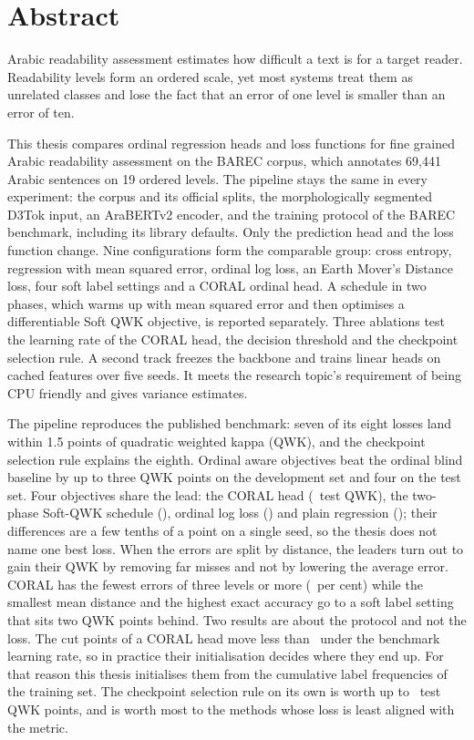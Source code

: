 \documentclass[12pt]{report}
\begin{document}
\clearpage
\chapter*{Abstract}
Arabic readability assessment estimates how difficult a text is for a target reader. Readability levels form an ordered scale, yet most systems treat them as unrelated classes and lose the fact that an error of one level is smaller than an error of ten.

This thesis compares ordinal regression heads and loss functions for fine grained Arabic readability assessment on the BAREC corpus, which annotates 69,441 Arabic sentences on 19 ordered levels. The pipeline stays the same in every experiment: the corpus and its official splits, the morphologically segmented D3Tok input, an AraBERTv2 encoder, and the training protocol of the BAREC benchmark, including its library defaults. Only the prediction head and the loss function change. Nine configurations form the comparable group: cross entropy, regression with mean squared error, ordinal log loss, an Earth Mover's Distance loss, four soft label settings and a CORAL ordinal head. A schedule in two phases, which warms up with mean squared error and then optimises a differentiable Soft QWK objective, is reported separately. Three ablations test the learning rate of the CORAL head, the decision threshold and the checkpoint selection rule. A second track freezes the backbone and trains linear heads on cached features over five seeds. It meets the research topic's requirement of being CPU friendly and gives variance estimates.

The pipeline reproduces the published benchmark: seven of its eight losses land within 1.5 points of quadratic weighted kappa (QWK), and the checkpoint selection rule explains the eighth. Ordinal aware objectives beat the ordinal blind baseline by up to three QWK points on the development set and four on the test set. Four objectives share the lead: the CORAL head (\testQwkCoral\ test QWK), the two-phase Soft-QWK schedule (\testQwkSoftqwk), ordinal log loss (\testQwkOLL) and plain regression (\testQwkMSE); their differences are a few tenths of a point on a single seed, so the thesis does not name one best loss. When the errors are split by distance, the leaders turn out to gain their QWK by removing far misses and not by lowering the average error. CORAL has the fewest errors of three levels or more (\testFarThreeCoral\ per cent) while the smallest mean distance and the highest exact accuracy go to a soft label setting that sits two QWK points behind. Two results are about the protocol and not the loss. The cut points of a CORAL head move less than \cutMoveFineCoral\ under the benchmark learning rate, so in practice their initialisation decides where they end up. For that reason this thesis initialises them from the cumulative label frequencies of the training set. The checkpoint selection rule on its own is worth up to \qwkselTestGainMax\ test QWK points, and is worth most to the methods whose loss is least aligned with the metric.
\end{document}
